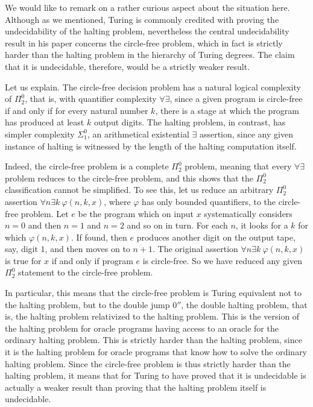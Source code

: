 \documentclass[12pt]{amsart}
\begin{document}
We would like to remark on a rather curious aspect about the situation here. Although as we mentioned, Turing is commonly credited with proving the undecidability of the halting problem, nevertheless the central undecidability result in his paper concerns the circle-free problem, which in fact is strictly harder than the halting problem in the hierarchy of Turing degrees. The claim that it is undecidable, therefore, would be a strictly weaker result.

Let us explain. The circle-free decision problem has a natural logical complexity of $\Pi^0_2$, that is, with quantifier complexity $\forall\exists$, since a given program is circle-free if and only if for every natural number $k$, there is a stage at which the program has produced at least $k$ output digits. The halting problem, in contrast, has simpler complexity $\Sigma^0_1$, an arithmetical existential $\exists$ assertion, since any given instance of halting is witnessed by the length of the halting computation itself.

Indeed, the circle-free problem is a complete $\Pi^0_2$ problem, meaning that every $\forall\exists$ problem reduces to the circle-free problem, and this shows that the $\Pi^0_2$ classification cannot be simplified. To see this, let us reduce an arbitrary $\Pi^0_2$ assertion $\forall n\exists k\ \varphi(n,k,x)$, where $\varphi$ has only bounded quantifiers, to the circle-free problem. Let $e$ be the program which on input $x$ systematically considers $n=0$ and then $n=1$ and $n=2$ and so on in turn. For each $n$, it looks for a $k$ for which $\varphi(n,k,x)$. If found, then $e$ produces another digit on the output tape, say, digit $1$, and then moves on to $n+1$. The original assertion $\forall n\exists k\ \varphi(n,k,x)$ is true for $x$ if and only if program $e$ is circle-free. So we have reduced any given $\Pi^0_2$ statement to the circle-free problem. 

In particular, this means that the circle-free problem is Turing equivalent not to the halting problem, but to the double jump $0''$, the double halting problem, that is, the halting problem relativized to the halting problem. This is the version of the halting problem for oracle programs having access to an oracle for the ordinary halting problem. This is strictly harder than the halting problem, since it is the halting problem for oracle programs that know how to solve the ordinary halting problem. Since the circle-free problem is thus strictly harder than the halting problem, it means that for Turing to have proved that it is undecidable is actually a weaker result than proving that the halting problem itself is undecidable.
\end{document}
